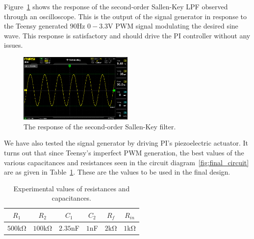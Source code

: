 
Figure~\ref{fig:sallenkey_osc} shows the response of the second-order Sallen-Key
LPF observed through an oscilloscope. This is the output of the signal generator
in response to the Teensy generated $90$\unit{\hertz} $0-3.3$\unit{\volt} PWM
signal modulating the desired sine wave. This response is satisfactory and
should drive the PI controller without any issues.

\begin{figure}[bh]
    \includegraphics[width=0.5\textwidth]{./figures/output_osc.jpg}
    \caption{The response of the second-order Sallen-Key filter.}
    \label{fig:sallenkey_osc}
\end{figure}

We have also tested the signal generator by driving PI's piezoelectric actuator.
It turns out that since Teensy's imperfect PWM generation, the best values of
the various capacitances and resistances seen in the circuit
diagram~\ref{fig:final_circuit} are as given in Table~\ref{tab:expvalues}. These
are the values to be used in the final design.

{\renewcommand{\arraystretch}{1.5}
\begin{table}
    \centering
    \caption{Experimental values of resistances and capacitances.}
    \begin{tabular}{*6c}
        \toprule
        $R_1$ & $R_2$ & $C_1$ & $C_2$ & $R_f$ & $R_{in}$ \\    
        \hline
        \midrule
        $500$\unit{\kilo\ohm} & $100$\unit{\kilo\ohm} & $2.35$\unit{\nano\farad}
          & $1$\unit{\nano\farad} & $2$\unit{\kilo\ohm} &
        $1$\unit{\kilo\ohm} \\
        \bottomrule
    \end{tabular}
    \label{tab:expvalues}
    \vspace{-1em}
\end{table}
}
